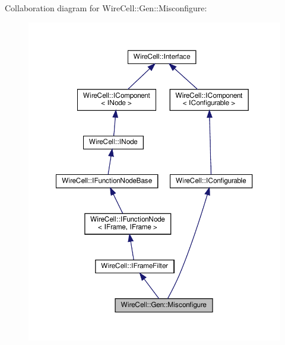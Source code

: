 Collaboration diagram for Wire\+Cell\+:\+:Gen\+:\+:Misconfigure\+:
\nopagebreak
\begin{figure}[H]
\begin{center}
\leavevmode
\includegraphics[width=350pt]{class_wire_cell_1_1_gen_1_1_misconfigure__coll__graph}
\end{center}
\end{figure}
